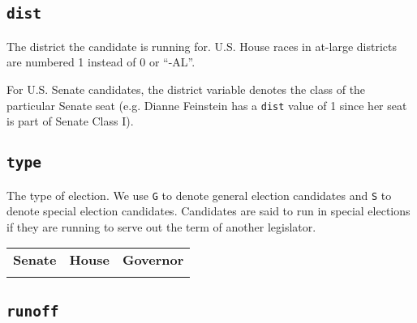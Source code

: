 \documentclass[12pt]{article}
\begin{document}
    \begin{tabularx}{\linewidth}{C}
    
    \end{tabularx}

\subsection*{\texttt{dist}}

The district the candidate is running for. U.S. House races in at-large districts are numbered 1 instead of 0 or ``-AL''. 

 For U.S. Senate candidates, the district variable denotes the class of the particular Senate seat (e.g. Dianne Feinstein has a \texttt{dist} value of 1 since her seat is part of Senate Class I). 

\begin{table}[!h]
\centering
\footnotesize

\end{table}





\subsection*{\texttt{type}}

The type of election. We use \texttt{G} to denote general election candidates and \texttt{S} to denote special election candidates. Candidates are said to run in special elections if they are running to serve out the term of another legislator. 
\begin{table}[!h]
\begin{tabularx}{\linewidth}{CCC}
    \textbf{Senate} & \textbf{House} & \textbf{Governor}\\
     &  & 
\end{tabularx}
\end{table}

\FloatBarrier

\subsection*{\texttt{runoff}}
\end{document}
